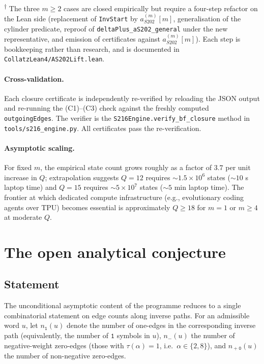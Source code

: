 \documentclass[11pt,a4paper]{article}
\theoremstyle{plain}
\theoremstyle{definition}
\newcommand{\aSat}{a_{S202}^{(m)}}
\newcommand{\numOnes}{n_{\mathtt{1}}}
\newcommand{\numNeg}{n_{\!-}}
\newcommand{\numPosZero}{n_{\!+\mathtt{0}}}
\begin{document}
\noindent\textsuperscript{$\dagger$} The three $m \ge 2$ cases are
closed empirically but require a four-step refactor on the Lean side
(replacement of \texttt{InvStart} by $\aSat[m]$, generalisation of
the cylinder predicate, reproof of \texttt{deltaPlus\_aS202\_general}
under the new representative, and emission of certificates against
$\aSat[m]$). Each step is bookkeeping rather than research, and is
documented in
\texttt{CollatzLean4/AS202Lift.lean}.

\paragraph{Cross-validation.} Each closure certificate is
independently re-verified by reloading the JSON output and re-running
the (C1)--(C3) check against the freshly computed
\texttt{outgoingEdges}. The verifier is the
\texttt{S216Engine.verify\_bf\_closure} method in
\texttt{tools/s216\_engine.py}. All certificates pass the
re-verification.

\paragraph{Asymptotic scaling.} For fixed $m$, the empirical state
count grows roughly as a factor of $3.7$ per unit increase in $Q$;
extrapolation suggests $Q = 12$ requires $\sim 1.5 \times 10^6$ states
($\sim 10$ s laptop time) and $Q = 15$ requires $\sim 5 \times 10^7$
states ($\sim 5$ min laptop time). The frontier at which dedicated
compute infrastructure (e.g., evolutionary coding agents over TPU)
becomes essential is approximately $Q \ge 18$ for $m = 1$ or
$m \ge 4$ at moderate $Q$.

\section{The open analytical conjecture}\label{sec:open-conjecture}

\subsection{Statement}

The unconditional asymptotic content of the programme reduces to a
single combinatorial statement on edge counts along inverse paths.
For an admissible word $u$, let $\numOnes(u)$ denote the number of
one-edges in the corresponding inverse path
(equivalently, the number of $\mathtt{1}$ symbols in $u$),
$\numNeg(u)$ the number of negative-weight zero-edges
(those with $\tau(\alpha) = 1$, i.e.\ $\alpha \in \{2, 8\}$), and
$\numPosZero(u)$ the number of non-negative zero-edges.
\end{document}
